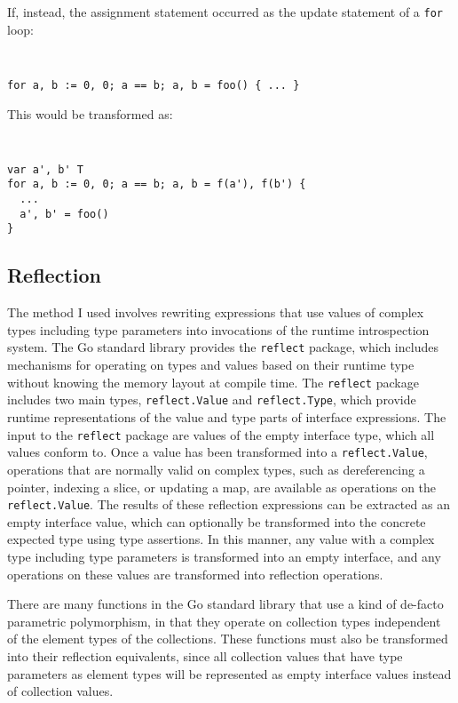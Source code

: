 \documentclass[letterpaper,twocolumn,11pt]{article}
\begin{document}
If, instead, the assignment statement occurred as the update statement of a \texttt{for} loop:
{ \tt \small
\begin{verbatim}
for a, b := 0, 0; a == b; a, b = foo() { ... }
\end{verbatim} 
}
This would be transformed as:
{ \tt \small
\begin{verbatim}
var a', b' T
for a, b := 0, 0; a == b; a, b = f(a'), f(b') {
  ...
  a', b' = foo()
}
\end{verbatim} 
}


\subsection{Reflection} \label{reflection}

The method I used involves rewriting expressions that use values of complex types including type parameters into invocations of the runtime introspection system. The Go standard library provides the \texttt{reflect} package, which includes mechanisms for operating on types and values based on their runtime type without knowing the memory layout at compile time. The \texttt{reflect} package includes two main types, \texttt{reflect.Value} and \texttt{reflect.Type}, which provide runtime representations of the value and type parts of interface expressions. The input to the \texttt{reflect} package are values of the empty interface type, which all values conform to. Once a value has been transformed into a \texttt{reflect.Value}, operations that are normally valid on complex types, such as dereferencing a pointer, indexing a slice, or updating a map, are available as operations on the \texttt{reflect.Value}. The results of these reflection expressions can be extracted as an empty interface value, which can optionally be transformed into the concrete expected type using type assertions. In this manner, any value with a complex type including type parameters is transformed into an empty interface, and any operations on these values are transformed into reflection operations.

There are many functions in the Go standard library that use a kind of de-facto parametric polymorphism, in that they operate on collection types independent of the element types of the collections. These functions must also be transformed into their reflection equivalents, since all collection values that have type parameters as element types will be represented as empty interface values instead of collection values.
\end{document}
